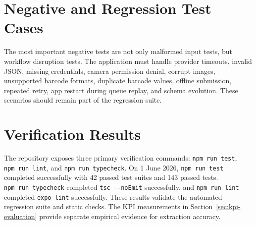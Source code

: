 \section{Negative and Regression Test Cases}

The most important negative tests are not only malformed input tests, but workflow disruption tests. The application must handle provider timeouts, invalid JSON, missing credentials, camera permission denial, corrupt images, unsupported barcode formats, duplicate barcode values, offline submission, repeated retry, app restart during queue replay, and schema evolution. These scenarios should remain part of the regression suite.

\section{Verification Results}

The repository exposes three primary verification commands: \texttt{npm\ run\ test}, \texttt{npm\ run\ lint}, and \texttt{npm\ run\ typecheck}. On 1 June 2026, \texttt{npm\ run\ test} completed successfully with 42 passed test suites and 143 passed tests. \texttt{npm\ run\ typecheck} completed \texttt{tsc\ -{}-noEmit} successfully, and \texttt{npm\ run\ lint} completed \texttt{expo\ lint} successfully. These results validate the automated regression suite and static checks. The KPI measurements in Section~\ref{sec:kpi-evaluation} provide separate empirical evidence for extraction accuracy.
